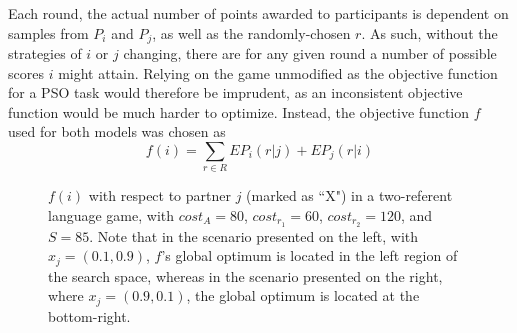 \documentclass[12pt,a4paper]{article}
\begin{document}
Each round, the actual number of points awarded to participants is dependent on samples from $P_i$ and $P_j$, as well as the randomly-chosen $r$. As such, without the strategies of $i$ or $j$ changing, there are for any given round a number of possible scores $i$ might attain. Relying on the game unmodified as the objective function for a PSO task would therefore be imprudent, as an inconsistent objective function would be much harder to optimize. Instead, the objective function $f$ used for both models was chosen as 
\begin{equation}
f(i) = \sum_{r \in R} EP_{i}(r|j) + EP_{j}(r|i)
\end{equation}

\begin{figure}
\centering
\scalebox{.725}{}
\caption{$f(i)$ with respect to partner $j$ (marked as ``X") in a two-referent language game, with $cost_A=80$, $cost_{r_1}=60$, $cost_{r_2}=120$, and $S=85$. Note that in the scenario presented on the left, with $x_j = (0.1, 0.9)$, $f$'s global optimum is located in the left region of the search space, whereas in the scenario presented on the right, where $x_j = (0.9, 0.1)$, the global optimum is located at the bottom-right.}
\label{fig:1}
\end{figure}
\end{document}
